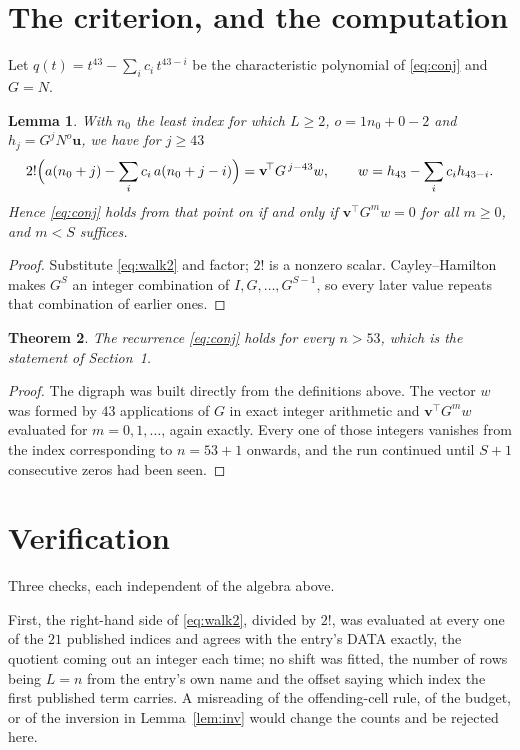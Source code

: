 \documentclass[11pt,a4paper]{article}
\theoremstyle{plain}
\newtheorem{theorem}{Theorem}
\newtheorem{lemma}[theorem]{Lemma}
\theoremstyle{definition}
\begin{document}
\section{The criterion, and the computation}

Let $q(t)=t^{43}-\sum_i c_i\,t^{43-i}$ be the characteristic polynomial of
\eqref{eq:conj} and $G=N$.

\begin{lemma}\label{lem:crit}
With $n_0$ the least index for which $L\ge2$, $o=1n_0+0-2$ and
$h_j=G^{j}N^{o}\mathbf{u}$, we have for $j\ge43$
\[
2!\Bigl(a(n_0+j)-\sum_i c_i\,a(n_0+j-i)\Bigr)=\mathbf{v}^{\!\top}G^{\,j-43}w,
\qquad w=h_{43}-\sum_i c_i h_{43-i} .
\]
Hence \eqref{eq:conj} holds from that point on if and only if
$\mathbf{v}^{\!\top}G^{m}w=0$ for all $m\ge0$, and $m<S$ suffices.
\end{lemma}

\begin{proof}
Substitute \eqref{eq:walk2} and factor; $2!$ is a nonzero scalar. Cayley--Hamilton
makes $G^{S}$ an integer combination of $I,G,\dots,G^{S-1}$, so every later value repeats
that combination of earlier ones.
\end{proof}

\begin{theorem}
The recurrence \eqref{eq:conj} holds for every $n>53$, which is the statement of
Section~1.
\end{theorem}

\begin{proof}
The digraph was built directly from the definitions above. The vector $w$ was formed by
$43$ applications of $G$ in exact integer arithmetic and $\mathbf{v}^{\!\top}G^{m}w$
evaluated for $m=0,1,\dots$, again exactly. Every one of those integers vanishes from the
index corresponding to $n=53+1$ onwards, and the run continued until $S+1$ consecutive
zeros had been seen.
\end{proof}

\section{Verification}

Three checks, each independent of the algebra above.

First, the right-hand side of \eqref{eq:walk2}, divided by $2!$, was evaluated at every
one of the $21$ published indices and agrees with the entry's DATA exactly, the quotient
coming out an integer each time; no shift was fitted, the number of rows being
$L=n$ from the entry's own name and the offset saying which index the first published
term carries. A misreading of the offending-cell rule, of the budget, or of the inversion in
Lemma~\ref{lem:inv} would change the counts and be rejected here.
\end{document}

